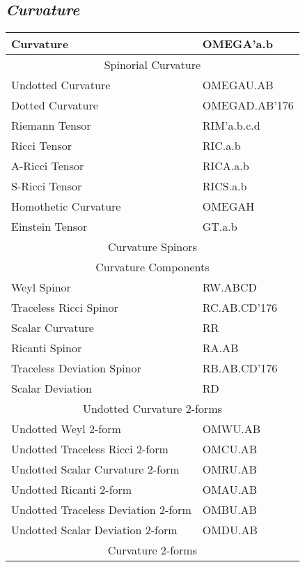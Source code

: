 \documentclass[twocolumn]{article}
\newcommand{\grgtt}{\ttfamily}
\renewcommand{\tt}{\grgtt}
\newcommand{\cc}{{\tt \char'176}}           %
\begin{document}
\subsection{\sf\slshape  Curvature}
\begin{tabular}{|l|l|}\hline
\tt    Curvature           &\tt   OMEGA'a.b\\
\hline
\multicolumn{2}{|c|}{\tt    Spinorial Curvature}\\
\tt    Undotted Curvature  &\tt   OMEGAU.AB\\
\tt    Dotted Curvature    &\tt   OMEGAD.AB\cc\\
\hline
\tt    Riemann Tensor      &\tt   RIM'a.b.c.d\\
\tt    Ricci Tensor        &\tt   RIC.a.b\\
\tt    A-Ricci Tensor      &\tt   RICA.a.b\\
\tt    S-Ricci Tensor      &\tt   RICS.a.b\\
\tt    Homothetic Curvature &\tt  OMEGAH\\
\tt    Einstein Tensor      &\tt  GT.a.b\\
\hline
\multicolumn{2}{|c|}{\tt    Curvature Spinors}\\
\multicolumn{2}{|c|}{\tt    Curvature Components}\\
\tt    Weyl Spinor                &\tt  RW.ABCD\\
\tt    Traceless Ricci Spinor     &\tt  RC.AB.CD\cc\\
\tt    Scalar Curvature           &\tt  RR\\
\tt    Ricanti Spinor             &\tt  RA.AB\\
\tt    Traceless Deviation Spinor &\tt  RB.AB.CD\cc\\
\tt    Scalar Deviation           &\tt  RD\\
\hline
\multicolumn{2}{|c|}{\tt Undotted Curvature 2-forms}\\
\tt    Undotted Weyl 2-form                &\tt  OMWU.AB \\
\tt    Undotted Traceless Ricci 2-form     &\tt  OMCU.AB \\
\tt    Undotted Scalar Curvature 2-form    &\tt  OMRU.AB \\
\tt    Undotted Ricanti 2-form             &\tt  OMAU.AB \\
\tt    Undotted Traceless Deviation 2-form &\tt  OMBU.AB \\
\tt    Undotted Scalar Deviation 2-form    &\tt  OMDU.AB \\
\hline
\multicolumn{2}{|c|}{\tt  Curvature 2-forms}\\

\end{tabular}
\end{document}
